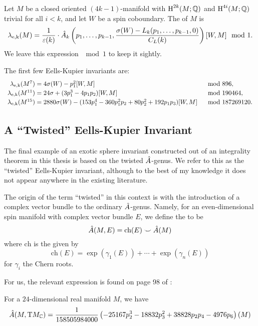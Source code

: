 \begin{definition}
	Let $M$ be a closed oriented $(4k-1)$-manifold with $\operatorname{H}^{2k}(M;\mathbb{Q})$ and $\operatorname{H}^{4i}(M;\mathbb{Q})$ trivial for all $i<k$, and let $W$ be a spin coboundary. The  of $M$ is
	\[
		\lambda_{\mathrm{e,k}}(M) = \frac{1}{\varepsilon(k)}\cdot {\hat{A}}_k\left(p_1, \ldots, p_{k-1}, \frac{\sigma(W)-L_k(p_1,\ldots, p_{k-1},0)}{C_L(k)}\right)[W,M]\mod 1.
	\]
	We leave this expression $\mod 1$ to keep it sightly.
\end{definition}

\begin{example}
	The first few Eells-Kupier invariants are:
	\[
		\renewcommand{\arraystretch}{1.2}
		\begin{array}{r@{\;}ll}
			\ekinv(M^7)
			 & = 4\sigma(W) - p_1^2[W, M]
			 & \mod 896,                                                        \\
			\ekinv(M^{11})
			 & = 24\sigma + (3p_1^3-4p_1p_2)[W,M]
			 & \mod 190464,                                                       \\
			\ekinv(M^{15})
			 & = 2880\sigma(W) - (153p_1^4-360p_1^2p_2+80p_2^2+192p_1p_3)[W,M]
			 & \mod 187269120.
		\end{array}
	\]
\end{example}

\subsection{A ``Twisted'' Eells-Kupier Invariant}

The final example of an exotic sphere invariant constructed out of an integrality theorem in this thesis is based on the twisted ${\hat{A}}$-genus. We refer to this as the ``twisted'' Eells-Kupier invariant, although to the best of my knowledge it does not appear anywhere in the existing literature.

The origin of the term ``twisted'' in this context is with the introduction of a complex vector bundle to the ordinary ${\hat{A}}$-genus.
Namely, for an even-dimensional spin manifold with complex vector bundle $E$, we define the  to be 
\[{\hat{A}}(M, E) = \textrm{ch}(E)\smile {\hat{A}}(M)\] 
where $\textrm{ch}$ is the  given by 
\[
		\textrm{ch}(E) = \exp(\gamma_1(E))+\cdots +\exp(\gamma_n(E))
\]
for $\gamma_i$ the Chern roots.

For us, the relevant expression is found on page 98 of \cite{hopkinsmahowald2002bo8}:
\begin{proposition}
	For a $24$-dimensional real manifold $M$, we have
	\[
		{\hat{A}}(M,\mathrm{T} M_{\mathbb{C}}) = \frac{1}{158505984000}\left(-25167p_2^3 - 18832p_3^2 + 38828p_2p_4 - 4976p_6\right)(M)
	\]
\end{proposition}

